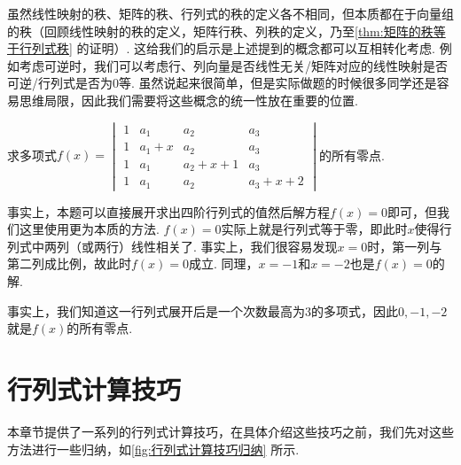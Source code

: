 虽然线性映射的秩、矩阵的秩、行列式的秩的定义各不相同，但本质都在于向量组的秩（回顾线性映射的秩的定义，矩阵行秩、列秩的定义，乃至\autoref{thm:矩阵的秩等于行列式秩} 的证明）. 这给我们的启示是上述提到的概念都可以互相转化考虑. 例如考虑可逆时，我们可以考虑行、列向量是否线性无关/矩阵对应的线性映射是否可逆/行列式是否为0等. 虽然说起来很简单，但是实际做题的时候很多同学还是容易思维局限，因此我们需要将这些概念的统一性放在重要的位置.

\begin{example}{}{}
    求多项式$f(x)=\begin{vmatrix}
            1 & a_1   & a_2     & a_3     \\
            1 & a_1+x & a_2     & a_3     \\
            1 & a_1   & a_2+x+1 & a_3     \\
            1 & a_1   & a_2     & a_3+x+2
        \end{vmatrix}$的所有零点.
\end{example}

\begin{solution}
    事实上，本题可以直接展开求出四阶行列式的值然后解方程$f(x)=0$即可，但我们这里使用更为本质的方法. $f(x)=0$实际上就是行列式等于零，即此时$x$使得行列式中两列（或两行）线性相关了. 事实上，我们很容易发现$x=0$时，第一列与第二列成比例，故此时$f(x)=0$成立. 同理，$x=-1$和$x=-2$也是$f(x)=0$的解.

    事实上，我们知道这一行列式展开后是一个次数最高为3的多项式，因此$0,-1,-2$就是$f(x)$的所有零点.
\end{solution}


\section{行列式计算技巧}

本章节提供了一系列的行列式计算技巧，在具体介绍这些技巧之前，我们先对这些方法进行一些归纳，如\autoref{fig:行列式计算技巧归纳} 所示.

